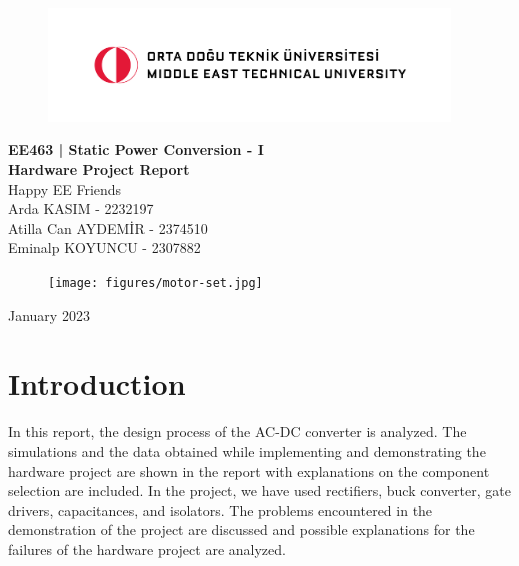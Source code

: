 \documentclass[12pt]{article}
\begin{document}
\begin{titlepage}
    \begin{center}
        \begin{figure}[t]
            \centering
            \includegraphics[width=0.95\textwidth]{figures/metu.png}
        \end{figure}
        \Large{\textbf{EE463 | Static Power Conversion - I}} \\
        \Huge{\textbf{Hardware Project Report}} \\
        \Large{Happy EE Friends} \\
        \vspace*{15 mm} 
        \large
        Arda KASIM - 2232197 \\
        Atilla Can AYDEMİR - 2374510 \\
        Eminalp KOYUNCU - 2307882 \\
        \vspace*{\fill}
        \begin{figure}[h]
          \centering
          \texttt{[image: figures/motor-set.jpg]}
        \end{figure}
        \vspace*{\fill}
           January 2023
        \end{center}
\end{titlepage}

\pagestyle{fancy}
\fancyhead{}
\section{\Large Introduction}
\raggedright
In this report, the design process of the AC-DC converter is analyzed. The simulations and the data obtained while implementing and demonstrating the hardware project are shown in the report with explanations on the component selection are included. In the project, we have used rectifiers, buck converter, gate drivers, capacitances, and isolators. The problems encountered in the demonstration of the project are discussed and possible explanations for the failures of the hardware project are analyzed. 
\end{document}
